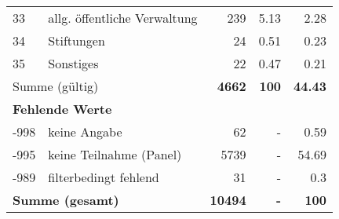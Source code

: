 \begin{longtable}{lXrrr}
        33 & \multicolumn{1}{X}{allg. öffentliche Verwaltung} & %
          \num{239} &
          \num[round-mode=places,round-precision=2]{5,13} &
          \num[round-mode=places,round-precision=2]{2,28} \\

        34 & \multicolumn{1}{X}{Stiftungen} & %
          \num{24} &
          \num[round-mode=places,round-precision=2]{0,51} &
          \num[round-mode=places,round-precision=2]{0,23} \\

        35 & \multicolumn{1}{X}{Sonstiges} & %
          \num{22} &
          \num[round-mode=places,round-precision=2]{0,47} &
          \num[round-mode=places,round-precision=2]{0,21} \\

     \midrule
     \multicolumn{2}{l}{Summe (gültig)} &
       \textbf{\num{4662}} &
     \textbf{100} &
       \textbf{\num[round-mode=places,round-precision=2]{44,43}} \\
     \multicolumn{5}{l}{\textbf{Fehlende Werte}}\\
       -998 &
       keine Angabe &
         \num{62} &
        - &
         \num[round-mode=places,round-precision=2]{0,59} \\
       -995 &
       keine Teilnahme (Panel) &
         \num{5739} &
        - &
         \num[round-mode=places,round-precision=2]{54,69} \\
       -989 &
       filterbedingt fehlend &
         \num{31} &
        - &
         \num[round-mode=places,round-precision=2]{0,3} \\
     \midrule
     \multicolumn{2}{l}{\textbf{Summe (gesamt)}} &
          \textbf{\num{10494}} &
        \textbf{-} &
        \textbf{100} \\
     \bottomrule
     \end{longtable}
     
